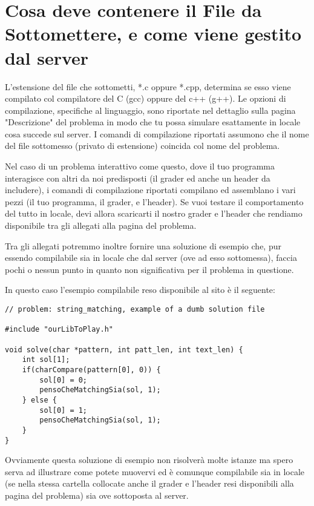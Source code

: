 \documentclass[a4paper,11pt]{article}
\begin{document}
  \section*{Cosa deve contenere il File da Sottomettere, e come viene gestito dal server}

\noindent
  L'estensione del file che sottometti, *.c oppure *.cpp,
  determina se esso viene compilato col compilatore del C (gcc)   oppure del c++ (g++).
  Le opzioni di compilazione, specifiche al linguaggio,
  sono riportate nel dettaglio sulla pagina "Descrizione" del problema
  in modo che tu possa simulare esattamente in locale cosa succede sul server.
  I comandi di compilazione riportati assumono che il nome del file sottomesso (privato di estensione) coincida col nome del problema.

\noindent
  Nel caso di un problema interattivo come questo,
  dove il tuo programma interagisce con altri da noi predisposti
  (il grader ed anche un header da includere), i comandi di compilazione riportati compilano ed assemblano i vari pezzi (il tuo programma, il grader, e l'header).
  Se vuoi testare il comportamento del tutto in locale,
  devi allora scaricarti il nostro grader e l'header che rendiamo disponibile tra gli allegati alla pagina del problema.
  
\noindent
  Tra gli allegati potremmo inoltre fornire una soluzione di esempio che,
  pur essendo compilabile sia in locale che dal server (ove ad esso sottomessa),
  faccia pochi o nessun punto in quanto non significativa per il problema
  in questione.
  
\noindent
  In questo caso l'esempio compilabile reso disponibile al sito \`e il seguente:
\begin{verbatim}
// problem: string_matching, example of a dumb solution file

#include "ourLibToPlay.h"

void solve(char *pattern, int patt_len, int text_len) {
    int sol[1];
    if(charCompare(pattern[0], 0)) {
        sol[0] = 0;
        pensoCheMatchingSia(sol, 1);    
    } else {
        sol[0] = 1;    
        pensoCheMatchingSia(sol, 1);    
    }
}
\end{verbatim}

\noindent
Ovviamente questa soluzione di esempio non risolver\`a molte istanze
ma spero serva ad illustrare come potete muovervi ed \`e comunque compilabile sia in locale (se nella stessa cartella collocate anche il grader e l'header resi disponibili alla pagina del problema) sia ove sottoposta al server.
  
  
\end{document}
